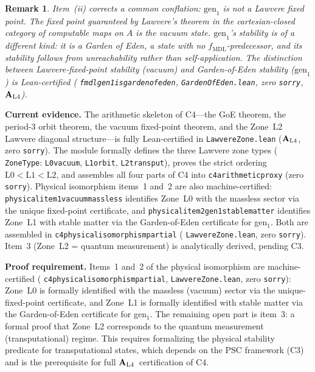 \documentclass[12pt,letterpaper]{article}
\newtheorem{remark}[theorem]{Remark}
\newcommand{\fmdl}{f_{\mathrm{MDL}}}
\newcommand{\catAL}{\ensuremath{\textbf{A}_{\rm L4}}}
\newcommand{\lean}[1]{%
  \penalty-100
  \begingroup\def\_{\textunderscore\allowbreak}\texttt{#1}\endgroup}
\begin{document}
\begin{remark}
Item~(ii) corrects a common conflation: $\mathrm{gen}_1$ is \emph{not} a Lawvere
fixed point.  The fixed point guaranteed by Lawvere's theorem in the
cartesian-closed category of computable maps on $A$ is the vacuum state.
$\mathrm{gen}_1$'s stability is of a different kind: it is a Garden of Eden, a
state with no $\fmdl$-predecessor, and its stability follows from unreachability
rather than self-application.  The distinction between Lawvere-fixed-point
stability (vacuum) and Garden-of-Eden stability ($\mathrm{gen}_1$) is
Lean-certified (\lean{fmdl\_gen1\_is\allowbreak\_garden\_of\_eden}, \lean{GardenOfEden.lean}, zero
\texttt{sorry}, \catAL).
\end{remark}

\noindent\textbf{Current evidence.}  The arithmetic skeleton of C4---the GoE
theorem, the period-3 orbit theorem, the vacuum fixed-point theorem, and the
Zone~L2 Lawvere diagonal structure---is fully Lean-certified in
\lean{LawvereZone.lean} (\catAL, zero \texttt{sorry}).  The module formally
defines the three Lawvere zone types (\lean{ZoneType}: \lean{L0\_vacuum},
\lean{L1\_orbit}, \lean{L2\_transput}), proves the strict ordering
$\text{L0} < \text{L1} < \text{L2}$, and assembles all four parts of C4 into
\lean{c4\_arithmetic\_proxy} (zero \texttt{sorry}).
Physical isomorphism items~1 and~2 are also machine-certified:
\lean{physical\_item1\_vacuum\_massless} identifies Zone~L0 with the massless
sector via the unique fixed-point certificate, and
\lean{physical\_item2\_gen1\_stable\_matter} identifies Zone~L1 with stable
matter via the Garden-of-Eden certificate for gen$_1$.  Both are assembled in
\lean{c4\_physical\_isomorphism\_partial} (\lean{LawvereZone.lean}, zero \texttt{sorry}).
Item~3 (Zone~L2 = quantum measurement) is analytically derived, pending C3.

\noindent\textbf{Proof requirement.}  Items~1 and~2 of the physical isomorphism
are machine-certified (\lean{c4\_physical\_isomorphism\_partial},
\lean{LawvereZone.lean}, zero \texttt{sorry}): Zone~L0 is formally identified
with the massless (vacuum) sector via the unique-fixed-point certificate, and
Zone~L1 is formally identified with stable matter via the Garden-of-Eden
certificate for gen$_1$.  The remaining open part is item~3: a formal proof
that Zone~L2 corresponds to the quantum measurement (transputational) regime.
This requires formalizing the physical stability predicate for transputational
states, which depends on the PSC framework (C3) and is the prerequisite for
full \catAL\ certification of C4.
\end{document}
